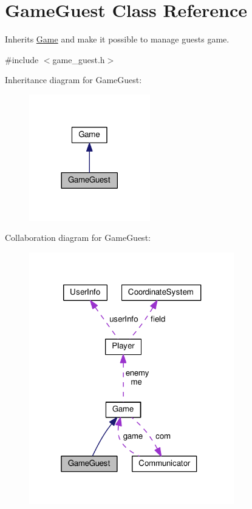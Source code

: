 \hypertarget{classMODEL_1_1GameGuest}{}\section{Game\+Guest Class Reference}
\label{classMODEL_1_1GameGuest}


Inherits \hyperlink{classMODEL_1_1Game}{Game} and make it possible to manage guests game.  




{\ttfamily \#include $<$game\+\_\+guest.\+h$>$}



Inheritance diagram for Game\+Guest\+:\nopagebreak
\begin{figure}[H]
\begin{center}
\leavevmode
\includegraphics[width=149pt]{classMODEL_1_1GameGuest__inherit__graph}
\end{center}
\end{figure}


Collaboration diagram for Game\+Guest\+:\nopagebreak
\begin{figure}[H]
\begin{center}
\leavevmode
\includegraphics[width=253pt]{classMODEL_1_1GameGuest__coll__graph}
\end{center}
\end{figure}

